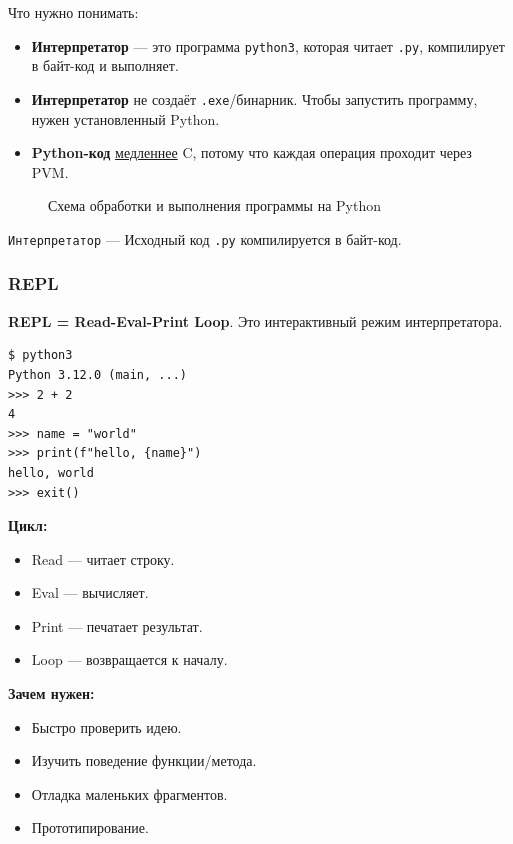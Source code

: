 Что нужно понимать:
\begin{itemize}
\item \textbf{Интерпретатор} — это программа \texttt{python3}, которая читает \texttt{.py}, компилирует в байт-код и выполняет.
\item \textbf{Интерпретатор} не создаёт \texttt{.exe}/бинарник. Чтобы запустить программу, нужен \linebreak  установленный Python.
\item \textbf{Python-код} \underline{медленнее} C, потому что каждая операция проходит через PVM.
\end{itemize}

\begin{figure}[htbp]
  \centering
  \resizebox{0.65\textwidth}{!}{}
  \caption{Схема обработки и выполнения программы на Python}
  \label{fig:python-pipeline}
\end{figure}

\begin{warningbox2}
\texttt{Интерпретатор} --- Исходный код \texttt{.py} компилируется в байт-код.
\end{warningbox2}

\subsubsection{REPL}

\textbf{REPL = Read-Eval-Print Loop}. Это интерактивный режим интерпретатора.

\begin{lstlisting}
$ python3
Python 3.12.0 (main, ...)
>>> 2 + 2
4
>>> name = "world"
>>> print(f"hello, {name}")
hello, world
>>> exit()
\end{lstlisting}

\textbf{Цикл:}
\begin{itemize}
\item Read — читает строку.
\item Eval — вычисляет.
\item Print — печатает результат.
\item Loop — возвращается к началу.
\end{itemize}

\textbf{Зачем нужен:}
\begin{itemize}
\item Быстро проверить идею.
\item Изучить поведение функции/метода.
\item Отладка маленьких фрагментов.
\item Прототипирование.
\end{itemize}

